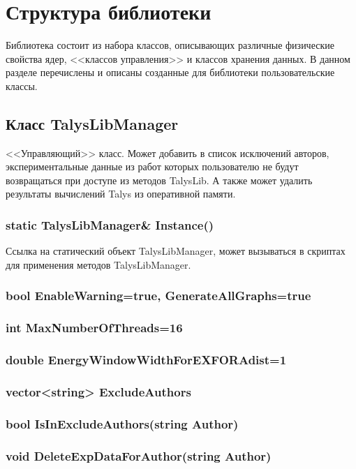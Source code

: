 \documentclass[a4paper,12pt]{extarticle}
\begin{document}
\section{Структура библиотеки}
Библиотека состоит из набора классов, описывающих различные физические свойства ядер, <<классов управления>> и классов хранения данных. В данном разделе перечислены и описаны созданные для библиотеки пользовательские классы. 
\subsection{Класс TalysLibManager}
<<Управляющий>> класс. Может добавить в список исключений авторов, экспериментальные данные из работ которых пользователю не будут возвращаться при доступе из методов TalysLib. А также может удалить результаты вычислений Talys из оперативной памяти.
\subsubsection{static TalysLibManager\textbf{\&} Instance()}
Ссылка на статический объект TalysLibManager, может вызываться в скриптах для применения методов TalysLibManager.
\subsubsection{bool EnableWarning=true, GenerateAllGraphs=true}

\subsubsection{int MaxNumberOfThreads=16}

\subsubsection{double EnergyWindowWidthForEXFORAdist=1}

\subsubsection{vector<string> ExcludeAuthors}

\subsubsection{bool IsInExcludeAuthors(string Author)}

\subsubsection{void DeleteExpDataForAuthor(string Author)}
\end{document}

